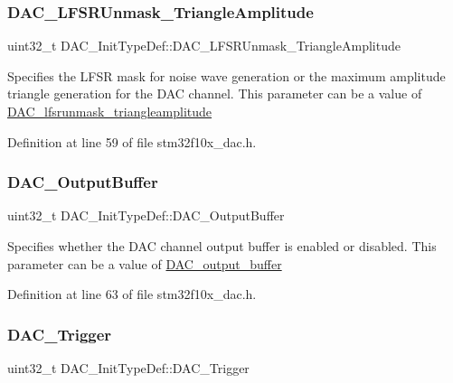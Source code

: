 \subsubsection{\texorpdfstring{D\+A\+C\+\_\+\+L\+F\+S\+R\+Unmask\+\_\+\+Triangle\+Amplitude}{DAC\_LFSRUnmask\_TriangleAmplitude}}
{\footnotesize\ttfamily uint32\+\_\+t D\+A\+C\+\_\+\+Init\+Type\+Def\+::\+D\+A\+C\+\_\+\+L\+F\+S\+R\+Unmask\+\_\+\+Triangle\+Amplitude}

Specifies the L\+F\+SR mask for noise wave generation or the maximum amplitude triangle generation for the D\+AC channel. This parameter can be a value of \hyperlink{group___d_a_c__lfsrunmask__triangleamplitude}{D\+A\+C\+\_\+lfsrunmask\+\_\+triangleamplitude} 

Definition at line 59 of file stm32f10x\+\_\+dac.\+h.

\mbox{\label{struct_d_a_c___init_type_def_ad3e9e01486443e99f19e65a446b03ca6}} 
\subsubsection{\texorpdfstring{D\+A\+C\+\_\+\+Output\+Buffer}{DAC\_OutputBuffer}}
{\footnotesize\ttfamily uint32\+\_\+t D\+A\+C\+\_\+\+Init\+Type\+Def\+::\+D\+A\+C\+\_\+\+Output\+Buffer}

Specifies whether the D\+AC channel output buffer is enabled or disabled. This parameter can be a value of \hyperlink{group___d_a_c__output__buffer}{D\+A\+C\+\_\+output\+\_\+buffer} 

Definition at line 63 of file stm32f10x\+\_\+dac.\+h.

\mbox{\label{struct_d_a_c___init_type_def_a7b26ebaeb51a0157a781f7de8ba779e5}} 
\subsubsection{\texorpdfstring{D\+A\+C\+\_\+\+Trigger}{DAC\_Trigger}}
{\footnotesize\ttfamily uint32\+\_\+t D\+A\+C\+\_\+\+Init\+Type\+Def\+::\+D\+A\+C\+\_\+\+Trigger}


